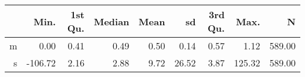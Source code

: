\begin{table}[ht]
\centering
\begin{tabular}{rrrrrrrrr}
  \hline
 & Min. & 1st Qu. & Median & Mean & sd & 3rd Qu. & Max. & N \\ 
  \hline
m & 0.00 & 0.41 & 0.49 & 0.50 & 0.14 & 0.57 & 1.12 & 589.00 \\ 
  s & -106.72 & 2.16 & 2.88 & 9.72 & 26.52 & 3.87 & 125.32 & 589.00 \\ 
   \hline
\end{tabular}
\end{table}
